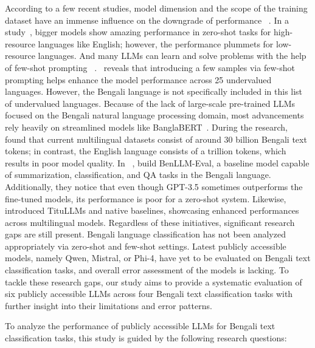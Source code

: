 \documentclass[10pt,letterpaper]{article}
\begin{document}
According to a few recent studies, model dimension and the scope of the training dataset have an immense influence on the downgrade of performance ~\cite{b47}. In a study~\cite{b35}, bigger models show amazing performance in zero-shot tasks for high-resource languages like English; however, the performance plummets for low-resource languages. And many LLMs can learn and solve problems with the help of few-shot prompting ~\cite{b46}.~\cite{b43} reveals that introducing a few samples via few-shot prompting helps enhance the model performance across 25 undervalued languages. However, the Bengali language is not specifically included in this list of undervalued languages. Because of the lack of large-scale pre-trained LLMs focused on the Bengali natural language processing domain, most advancements rely heavily on streamlined models like BanglaBERT~\cite{b4}. During the research,~\cite{b6} found that current multilingual datasets consist of around 30 billion Bengali text tokens; in contrast, the English language consists of a trillion tokens, which results in poor model quality. In ~\cite{b3}, build BenLLM-Eval, a baseline model capable of summarization, classification, and QA tasks in the Bengali language. Additionally, they notice that even though GPT-3.5 sometimes outperforms the fine-tuned models, its performance is poor for a zero-shot system. Likewise,~\cite{b21} introduced TituLLMs and native baselines, showcasing enhanced performances across multilingual models. Regardless of these initiatives, significant research gaps are still present. Bengali language classification has not been analyzed appropriately via zero-shot and few-shot settings. Latest publicly accessible models, namely Qwen, Mistral, or Phi-4, have yet to be evaluated on Bengali text classification tasks, and overall error assessment of the models is lacking. To tackle these research gaps, our study aims to provide a systematic evaluation of six publicly accessible LLMs across four Bengali text classification tasks with further insight into their limitations and error patterns.

To analyze the performance of publicly accessible LLMs for Bengali text classification tasks, this study is guided by the following research questions:
\end{document}
